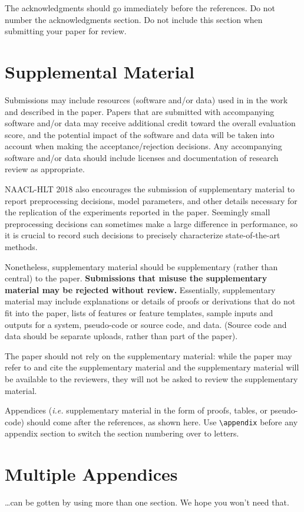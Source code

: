 \documentclass[11pt,a4paper]{article}
\begin{document}
The acknowledgments should go immediately before the references.  Do
not number the acknowledgments section. Do not include this section
when submitting your paper for review.

%
%



\appendix

\section{Supplemental Material}
\label{sec:supplemental}
Submissions may include resources (software and/or data) used in in the work and described in the paper. Papers that are submitted with accompanying software and/or data may receive additional credit toward the overall evaluation score, and the potential impact of the software and data will be taken into account when making the acceptance/rejection decisions. Any accompanying software and/or data should include licenses and documentation of research review as appropriate.


NAACL-HLT 2018 also encourages the submission of supplementary material to report preprocessing decisions, model parameters, and other details necessary for the replication of the experiments reported in the paper. Seemingly small preprocessing decisions can sometimes make a large difference in performance, so it is crucial to record such decisions to precisely characterize state-of-the-art methods. 

Nonetheless, supplementary material should be supplementary (rather
than central) to the paper. {\bf Submissions that misuse the supplementary 
material may be rejected without review.}
Essentially, supplementary material may include explanations or details
of proofs or derivations that do not fit into the paper, lists of
features or feature templates, sample inputs and outputs for a system,
pseudo-code or source code, and data. (Source code and data should
be separate uploads, rather than part of the paper).

The paper should not rely on the supplementary material: while the paper
may refer to and cite the supplementary material and the supplementary material will be available to the
reviewers, they will not be asked to review the
supplementary material.


Appendices ({\em i.e.} supplementary material in the form of proofs, tables,
or pseudo-code) should come after the references, as shown here. Use
\verb|\appendix| before any appendix section to switch the section
numbering over to letters.

\section{Multiple Appendices}
\dots can be gotten by using more than one section. We hope you won't
need that.
\end{document}
